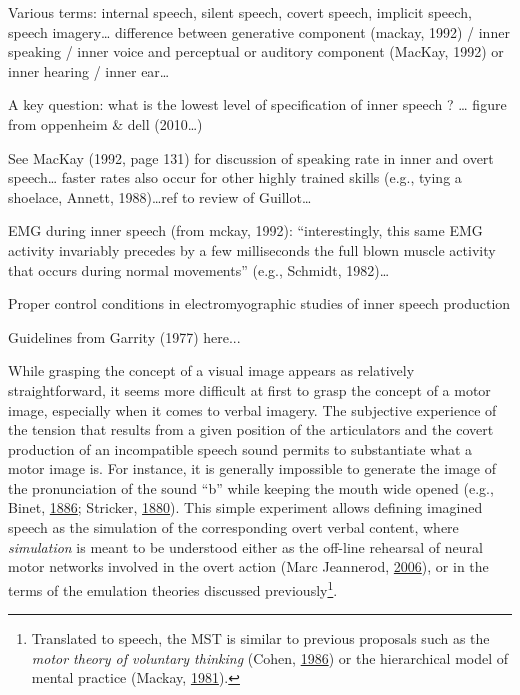 \documentclass[a4paper,12pt,twoside,openright,oldfontcommands]{memoir}
\let\rmarkdownfootnote\footnote%
\def\footnote{\protect\rmarkdownfootnote}
\begin{document}
Various terms: internal speech, silent speech, covert speech, implicit
speech, speech imagery\ldots{} difference between generative component
(mackay, 1992) / inner speaking / inner voice and perceptual or auditory
component (MacKay, 1992) or inner hearing / inner ear\ldots{}

A key question: what is the lowest level of specification of inner
speech ? \ldots{} figure from oppenheim \& dell (2010\ldots{})

See MacKay (1992, page 131) for discussion of speaking rate in inner and
overt speech\ldots{} faster rates also occur for other highly trained
skills (e.g., tying a shoelace, Annett, 1988)\ldots{}ref to review of
Guillot\ldots{}

EMG during inner speech (from mckay, 1992): ``interestingly, this same
EMG activity invariably precedes by a few milliseconds the full blown
muscle activity that occurs during normal movements'' (e.g., Schmidt,
1982)\ldots{}

\vspace{2mm}

\begin{mybox}[label = garrity]{Proper control conditions in electromyographic studies of inner speech production}

Guidelines from Garrity (1977) here...

\end{mybox}

While grasping the concept of a visual image appears as relatively
straightforward, it seems more difficult at first to grasp the concept
of a motor image, especially when it comes to verbal imagery. The
subjective experience of the tension that results from a given position
of the articulators and the covert production of an incompatible speech
sound permits to substantiate what a motor image is. For instance, it is
generally impossible to generate the image of the pronunciation of the
sound ``b'' while keeping the mouth wide opened (e.g., Binet,
\protect\hyperlink{ref-binet_psychologie_1886}{1886}; Stricker,
\protect\hyperlink{ref-stricker_studien_1880}{1880}). This simple
experiment allows defining imagined speech as the simulation of the
corresponding overt verbal content, where \emph{simulation} is meant to
be understood either as the off-line rehearsal of neural motor networks
involved in the overt action (Marc Jeannerod,
\protect\hyperlink{ref-jeannerod_motor_2006}{2006}), or in the terms of
the emulation theories discussed previously\footnote{Translated to
  speech, the MST is similar to previous proposals such as the
  \emph{motor theory of voluntary thinking} (Cohen,
  \protect\hyperlink{ref-cohen_motor_1986}{1986}) or the hierarchical
  model of mental practice (Mackay,
  \protect\hyperlink{ref-mackay_problem_1981}{1981}).}.
\end{document}
